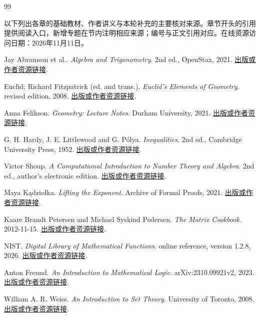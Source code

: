 \begin{thebibliography}{99}
\label{back:references}
\item[] 以下列出各章的基础教材、作者讲义与本轮补充的主要核对来源。章节开头的引用提供阅读入口，新增专题在节内注明相应来源；编号与正文引用对应。在线资源访问日期：2026年11月11日。

 Jay Abramson et al.. \emph{Algebra and Trigonometry}. 2nd ed., OpenStax, 2021. \href{https://openstax.org/details/books/algebra-and-trigonometry-2e}{出版或作者资源链接}.

 Euclid; Richard Fitzpatrick (ed. and trans.). \emph{Euclid's Elements of Geometry}. revised edition, 2008. \href{https://farside.ph.utexas.edu/Books/Euclid/Elements.pdf}{出版或作者资源链接}.

 Anna Felikson. \emph{Geometry: Lecture Notes}. Durham University, 2021. \href{https://www.maths.dur.ac.uk/users/anna.felikson/Geometry/Geometry21/notes.pdf}{出版或作者资源链接}.

 G. H. Hardy, J. E. Littlewood and G. Pólya. \emph{Inequalities}. 2nd ed., Cambridge University Press, 1952. \href{https://assets.cambridge.org/97805213/58804/toc/9780521358804_toc.pdf}{出版或作者资源链接}.

 Victor Shoup. \emph{A Computational Introduction to Number Theory and Algebra}. 2nd ed., author's electronic edition. \href{https://www.shoup.net/ntb/}{出版或作者资源链接}.

 Maya Kądziołka. \emph{Lifting the Exponent}. Archive of Formal Proofs, 2021. \href{https://www.isa-afp.org/entries/Lifting_the_Exponent.html}{出版或作者资源链接}.

 Kaare Brandt Petersen and Michael Syskind Pedersen. \emph{The Matrix Cookbook}. 2012-11-15. \href{https://www.math.uwaterloo.ca/~hwolkowi/matrixcookbook.pdf}{出版或作者资源链接}.

 NIST. \emph{Digital Library of Mathematical Functions}. online reference, version 1.2.8, 2026. \href{https://dlmf.nist.gov/}{出版或作者资源链接}.

 Anton Freund. \emph{An Introduction to Mathematical Logic}. arXiv:2310.09921v2, 2023. \href{https://arxiv.org/abs/2310.09921}{出版或作者资源链接}.

 William A. R. Weiss. \emph{An Introduction to Set Theory}. University of Toronto, 2008. \href{https://www.math.toronto.edu/weiss/set_theory.pdf}{出版或作者资源链接}.


\end{thebibliography}
